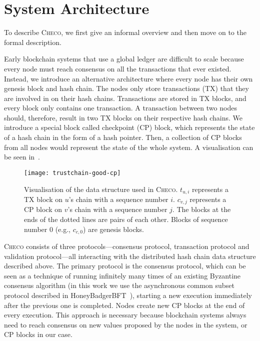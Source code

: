 \section{System Architecture}
\label{sec:system}

To describe \textsc{Checo}, we first give an informal overview and then move on to the formal description.

Early blockchain systems that use a global ledger are difficult to scale because every node must reach consensus on all the transactions that ever existed.
Instead, we introduce an alternative architecture where every node has their own genesis block and hash chain.
The nodes only store transactions (TX) that they are involved in on their hash chains.
Transactions are stored in TX blocks, and every block only contains one transaction.
A transaction between two nodes should, therefore, result in two TX blocks on their respective hash chains.
We introduce a special block called checkpoint (CP) block,
which represents the state of a hash chain in the form of a hash pointer.
Then, a collection of CP blocks from all nodes would represent the state of the whole system.
A visualisation can be seen in~.
\begin{figure}[h]
\centering
\texttt{[image: trustchain-good-cp]}
\caption{Visualisation of the data structure used in \textsc{Checo}.
$t_{u, i}$ represents a TX block on $u$'s chain with a sequence number $i$.
$c_{v, j}$ represents a CP block on $v$'s chain with a sequence number $j$.
The blocks at the ends of the dotted lines are pairs of each other.
Blocks of sequence number 0 (e.g., $c_{c, 0}$) are genesis blocks.}
\label{fig:trustchain-good-cp}
\end{figure}

\textsc{Checo} consists of three protocols---consensus protocol, transaction protocol and validation protocol---all interacting with the distributed hash chain data structure described above.
The primary protocol is the consensus protocol,
which can be seen as a technique of running infinitely many times of an existing Byzantine consensus algorithm (in this work we use the asynchronous common subset protocol described in HoneyBadgerBFT~\cite{miller2016honey}),
starting a new execution immediately after the previous one is completed.
Nodes create new CP blocks at the end of every execution.
This approach is necessary because blockchain systems always need to reach consensus on new values proposed by the nodes in the system,
or CP blocks in our case.

